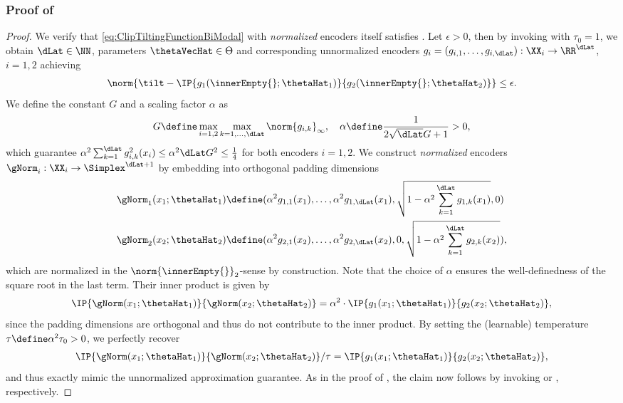 \documentclass{article}
\begin{document}
\subsubsection{Proof of }
\label{thm:NormalizedTwoClipUniversalApproximation-PROOF}
\begin{proof}
 We verify that \eqref{eq:ClipTiltingFunctionBiModal} with
 \emph{normalized} encoders itself satisfies
 .
 Let $\epsilon > 0$, then by invoking 
 with $\tau_0 = 1$, we obtain $\dLat \in \NN$, parameters $\thetaVecHat \in \Theta$ and corresponding
 unnormalized encoders $g_i = (g_{i,1}, \ldots, g_{i,\dLat}):\XX_i \to \RR^{\dLat}$,
 $i=1,2$ achieving
 \begin{align*}
  \norm{\tilt - \IP{g_1(\innerEmpty{};\thetaHat_1)}{g_2(\innerEmpty{};\thetaHat_2)}}
  \leq \epsilon.
 \end{align*}
 We define the constant $G$ and a scaling factor $\alpha$ as
 \begin{align*}
  G \define \max_{i=1,2} \max_{k=1,\ldots, \dLat} \norm{g_{i,k}}_{\infty}, \quad
  \alpha \define \frac{1}{2 \sqrt{\dLat} G + 1} > 0,
 \end{align*}
 which guarantee
 $\alpha^2 \sum_{k=1}^{\dLat} g_{i,k}^2(x_i) \leq \alpha^2 \dLat G^2 \leq \frac{1}{4}$
 for both encoders $i=1,2$. We construct \emph{normalized} encoders
 $\gNorm_i :\XX_i \to \Simplex^{\dLat + 1}$ by embedding into orthogonal padding
 dimensions
 \begin{align*}
  \gNorm_1(x_1;\thetaHat_1) & \define (\alpha^2 g_{1,1}(x_1), \ldots, \alpha^2 g_{1,\dLat}(x_1),
  \sqrt{1- \alpha^2 \sum_{k=1}^{\dLat} g_{1,k}(x_1)}, 0)                                         \\
  \gNorm_2(x_2;\thetaHat_2) & \define (\alpha^2 g_{2,1}(x_2), \ldots, \alpha^2 g_{2,\dLat}(x_2),
  0, \sqrt{1- \alpha^2 \sum_{k=1}^{\dLat} g_{2,k}(x_2)}),
 \end{align*}
 which are normalized in the $\norm{\innerEmpty{}}_{2}$-sense by construction.
 Note that the choice of $\alpha$ ensures the well-definedness of the square root
 in the last term. Their inner product is given by
 \begin{align*}
  \IP{\gNorm(x_1;\thetaHat_1)}{\gNorm(x_2;\thetaHat_2)}
  = \alpha^2 \cdot \IP{g_1(x_1;\thetaHat_1)}{g_2(x_2;\thetaHat_2)},
 \end{align*}
 since the padding dimensions are orthogonal and thus do not contribute to the inner
 product. By setting the (learnable) temperature $\tau \define \alpha^2 \tau_0 > 0$,
 we perfectly recover
 \begin{align*}
  \IP{\gNorm(x_1;\thetaHat_1)}{\gNorm(x_2;\thetaHat_2)} / \tau
  = \IP{g_1(x_1;\thetaHat_1)}{g_2(x_2;\thetaHat_2)},
 \end{align*}
 and thus exactly mimic the unnormalized approximation guarantee.
 As in the proof of ,
 the claim now follows by invoking
  or
 , respectively.
\end{proof}
\end{document}
